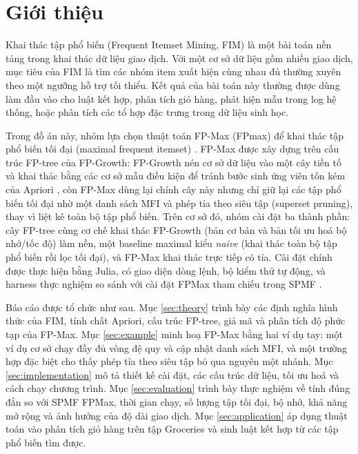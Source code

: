 \section{Giới thiệu}
\label{sec:introduction}

Khai thác tập phổ biến (Frequent Itemset Mining, FIM) là một bài toán nền tảng trong khai thác dữ liệu giao dịch. Với một cơ sở dữ liệu gồm nhiều giao dịch, mục tiêu của FIM là tìm các nhóm item xuất hiện cùng nhau đủ thường xuyên theo một ngưỡng hỗ trợ tối thiểu. Kết quả của bài toán này thường được dùng làm đầu vào cho luật kết hợp, phân tích giỏ hàng, phát hiện mẫu trong log hệ thống, hoặc phân tích các tổ hợp đặc trưng trong dữ liệu sinh học.

Trong đồ án này, nhóm lựa chọn thuật toán FP-Max (FPmax) để khai thác tập phổ biến tối đại (maximal frequent itemset) \cite{Grahne2003FPMax}. FP-Max được xây dựng trên cấu trúc FP-tree của FP-Growth: FP-Growth nén cơ sở dữ liệu vào một cây tiền tố và khai thác bằng các cơ sở mẫu điều kiện để tránh bước sinh ứng viên tốn kém của Apriori \cite{Han2000FPGrowth}, còn FP-Max dùng lại chính cây này nhưng chỉ giữ lại các tập phổ biến tối đại nhờ một danh sách MFI và phép tỉa theo siêu tập (superset pruning), thay vì liệt kê toàn bộ tập phổ biến. Trên cơ sở đó, nhóm cài đặt ba thành phần: cây FP-tree cùng cơ chế khai thác FP-Growth (bản cơ bản và bản tối ưu hoá bộ nhớ/tốc độ) làm nền, một baseline maximal kiểu \textit{naive} (khai thác toàn bộ tập phổ biến rồi lọc tối đại), và FP-Max khai thác trực tiếp có tỉa. Cài đặt chính được thực hiện bằng Julia, có giao diện dòng lệnh, bộ kiểm thử tự động, và harness thực nghiệm so sánh với cài đặt FPMax tham chiếu trong SPMF \cite{FournierViger2014SPMF}.

Báo cáo được tổ chức như sau. Mục \ref{sec:theory} trình bày các định nghĩa hình thức của FIM, tính chất Apriori, cấu trúc FP-tree, giả mã và phân tích độ phức tạp của FP-Max. Mục \ref{sec:example} minh hoạ FP-Max bằng hai ví dụ tay: một ví dụ cơ sở chạy đầy đủ vòng đệ quy và cập nhật danh sách MFI, và một trường hợp đặc biệt cho thấy phép tỉa theo siêu tập bỏ qua nguyên một nhánh. Mục \ref{sec:implementation} mô tả thiết kế cài đặt, các cấu trúc dữ liệu, tối ưu hoá và cách chạy chương trình. Mục \ref{sec:evaluation} trình bày thực nghiệm về tính đúng đắn so với SPMF FPMax, thời gian chạy, số lượng tập tối đại, bộ nhớ, khả năng mở rộng và ảnh hưởng của độ dài giao dịch. Mục \ref{sec:application} áp dụng thuật toán vào phân tích giỏ hàng trên tập Groceries và sinh luật kết hợp từ các tập phổ biến tìm được.
